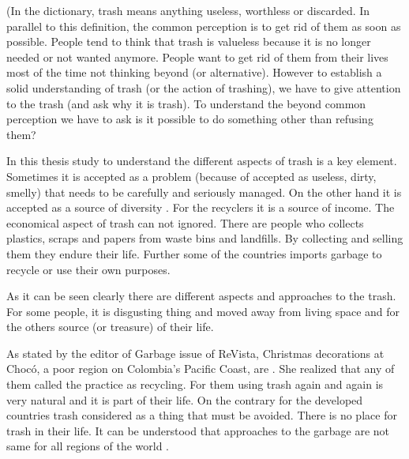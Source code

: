 %
%
(In the dictionary,  trash means anything useless, worthless or discarded. In parallel to this definition, the common perception is to get rid of them as soon as possible. People tend to think that trash is valueless because it is no longer needed or not wanted anymore. People want to get rid of them from their lives most of the time not thinking beyond (or alternative).  However to establish a solid understanding of trash (or the action of trashing), we have to give attention to the trash (and ask why it is trash). To understand the beyond common perception we have to ask is it possible to do something other than refusing them? %





%
%
In this thesis study to understand the different aspects of trash is a key element. Sometimes it is accepted as a problem (because of accepted as useless, dirty, smelly) that needs to be carefully and seriously managed. On the other hand it is accepted as a source of diversity . For the recyclers it is a source of income. The economical aspect of trash can not ignored. There are people who collects plastics, scraps and papers from waste bins and landfills. By collecting and selling them they endure their life. Further some of the countries  imports garbage to recycle or use their own purposes. 

As it can be seen clearly there are different aspects and approaches to the trash. For some people, it is disgusting thing and moved away from living space and for the others source (or treasure) of their life. 

As stated by the editor of Garbage issue of ReVista, Christmas decorations at Chocó, a poor region on Colombia’s Pacific Coast, are  \cite{erlick2015editorsletter}. She realized that any of them called the practice as recycling. For them using trash again and again is very natural and it is part of their life. On the contrary for the developed countries trash considered as a thing that must be avoided. There is no place for trash in their life. It can be understood that approaches to the garbage are not same for all regions of the world .


